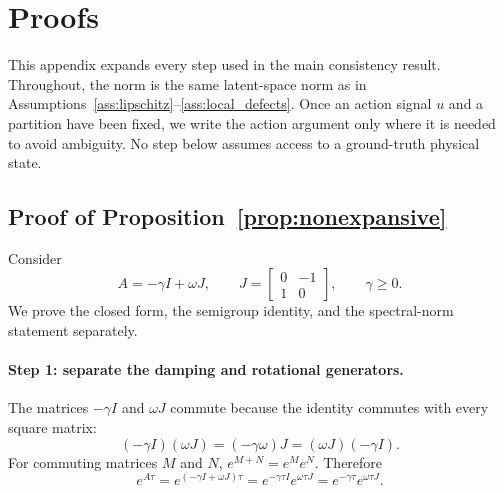 \documentclass{article}
\theoremstyle{plain}
\theoremstyle{definition}
\theoremstyle{remark}
\begin{document}
\section{Proofs}
\label{app:proofs}

This appendix expands every step used in the main consistency result. Throughout, the norm is the same latent-space norm as in Assumptions~\ref{ass:lipschitz}--\ref{ass:local_defects}. Once an action signal $u$ and a partition have been fixed, we write the action argument only where it is needed to avoid ambiguity. No step below assumes access to a ground-truth physical state.

\subsection{Proof of Proposition~\ref{prop:nonexpansive}}
\label{app:proof_nonexpansive}

Consider
\begin{equation}
A=-\gamma I+\omega J,
\qquad
J=
\begin{bmatrix}
0&-1\\
1&0
\end{bmatrix},
\qquad \gamma\ge0.
\end{equation}
We prove the closed form, the semigroup identity, and the spectral-norm statement separately.

\paragraph{Step 1: separate the damping and rotational generators.}
The matrices $-\gamma I$ and $\omega J$ commute because the identity commutes with every square matrix:
\begin{equation}
(-\gamma I)(\omega J)=(-\gamma\omega)J=(\omega J)(-\gamma I).
\end{equation}
For commuting matrices $M$ and $N$, $e^{M+N}=e^Me^N$. Therefore
\begin{equation}
e^{A\tau}
=e^{(-\gamma I+\omega J)\tau}
=e^{-\gamma\tau I}e^{\omega\tau J}
=e^{-\gamma\tau}e^{\omega\tau J}.
\label{eq:app_split_exp}
\end{equation}
\end{document}
